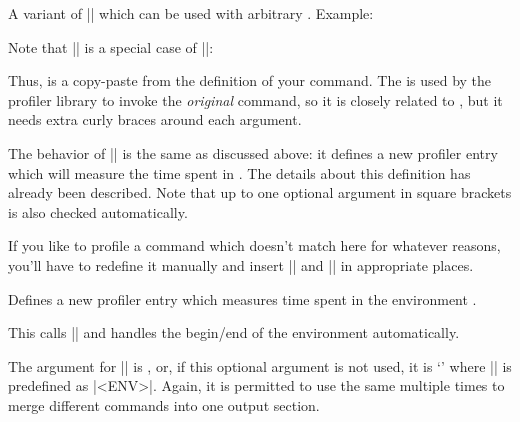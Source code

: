 \begin{command}{\pgfprofilenewforcommandpattern{}}
	A variant of |\pgfprofilenewforcommand| which can be used with arbitrary . Example:

Note that |\pgfprofilenewforcommand| is a special case of |\pgfprofilenewforcommandpattern|:
\begin{codeexample}
\def\mymacro#1#2{ ... }
\pgfprofilenewforcommand{}
\end{codeexample}
	Thus,  is a copy-paste from the definition of your command. The  is used by the profiler library to invoke the \emph{original} command, so it is closely related to , but it needs extra curly braces around each argument.

	The behavior of |\pgfprofilenewforcommandpattern| is the same as discussed above: it defines a new profiler entry which will measure the time spent in . The details about this definition has already been described. Note that up to one optional argument in square brackets is also checked automatically.
	

	If you like to profile a command which doesn't match here for whatever reasons, you'll have to redefine it manually and insert |\pgfprofilestart| and |\pgfprofileend| in appropriate places.
\end{command}

\begin{command}{\pgfprofilenewforenvironment{}}
	Defines a new profiler entry which measures time spent in the environment . 

	This calls |\pgfprofilenew| and handles the begin/end of the environment automatically.
	
	The argument for |\pgfprofilenew| is , or, if this optional argument is not used, it is `\declareandlabel{\pgfprofileenv}' where |\pgfprofileenv| is predefined as |<ENV>|. Again, it is permitted to use the same  multiple times to merge different commands into one output section.

\end{command}


